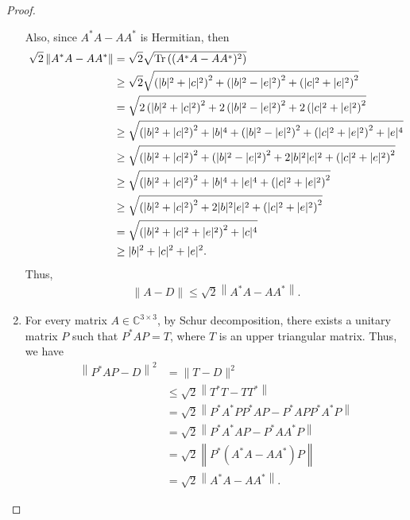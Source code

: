 \documentclass[11pt]{article}
\theoremstyle{definition}
\numberwithin{equation}{subsection}
\begin{document}
\begin{proof}
\begin{enumerate}[label=(\alph*)]
    Also, since $A^* A - A A^*$ is Hermitian, then 
    \begin{align*}
        \sqrt{2} \left\|A^* A - A A^*\right\| & = \sqrt{2} \sqrt{\Tr \left( (A^* A - A A^*)^2 \right)} \\
        & \geq \sqrt{2} \sqrt{\left(|b|^2 + |c|^2\right)^2 + \left(|b|^2 - |e|^2\right)^2 + \left(|c|^2 + |e|^2\right)^2} \\
        & =  \sqrt{2\left(|b|^2 + |c|^2\right)^2 + 2\left(|b|^2 - |e|^2\right)^2 + 2\left(|c|^2 + |e|^2\right)^2} \\
        & \geq \sqrt{\left(|b|^2 + |c|^2\right)^2 + |b|^4 + \left(|b|^2 - |e|^2\right)^2 + \left(|c|^2 + |e|^2\right)^2 + |e|^4} \\
        & \geq \sqrt{\left(|b|^2 + |c|^2\right)^2  + \left(|b|^2 - |e|^2\right)^2 + 2|b|^2|e|^2 + \left(|c|^2 + |e|^2\right)^2} \\
        & \geq \sqrt{\left(|b|^2 + |c|^2\right)^2  + |b|^4 + |e|^4 + \left(|c|^2 + |e|^2\right)^2} \\
        & \geq \sqrt{\left(|b|^2 + |c|^2\right)^2  + 2|b|^2|e|^2 + \left(|c|^2 + |e|^2\right)^2} \\
        & = \sqrt{\left(|b|^2 + |c|^2 + |e|^2\right)^2 + |c|^4} \\
        & \geq |b|^2 + |c|^2 + |e|^2.
    \end{align*}
    Thus, 
    \begin{align*}
        \|A - D\| \leq \sqrt{2} \left\|A^* A - A A^*\right\|.
    \end{align*}
    
    \item For every matrix $A \in \mathbb{C}^{3 \times 3}$, by Schur decomposition, there exists a unitary matrix $P$ such that $P^* A P = T$, where $T$ is an upper triangular matrix. Thus, we have
    \begin{align*}
        \left\|P^* A P - D \right\|^2 & = \|T - D\|^2 \\
        & \leq \sqrt{2} \left\|T^* T - T T^*\right\| \\
        & = \sqrt{2} \left\|P^* A^* P P^* A P - P^* A P P^* A^* P\right\| \\
        & = \sqrt{2} \left\|P^* A^* A P - P^* A A^* P\right\| \\
        & = \sqrt{2} \left\|P^* (A^* A - A A^*) P\right\| \\
        & = \sqrt{2} \left\|A^* A - A A^*\right\|.
    \end{align*}
\end{enumerate}
\end{proof}
\end{document}
